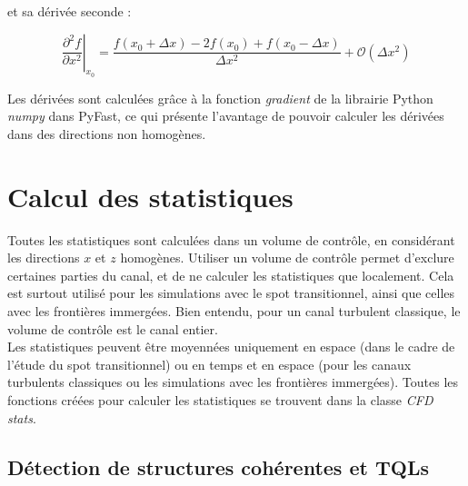 et sa dérivée seconde :

\begin{equation}
    \left. \frac{\partial^{2} f}{\partial x^{2}} \right|_{x_{0}} = \frac{f(x_{0}+\Delta x)-2 f(x_{0})+f(x_{0}-\Delta x)}{\Delta x^{2}} + \mathcal{O}(\Delta x^{2})
\end{equation}

Les dérivées sont calculées grâce à la fonction \textit{gradient} de la librairie Python \textit{numpy} dans PyFast, ce qui présente l'avantage de pouvoir calculer les dérivées dans des directions non homogènes.

\clearpage
\section{Calcul des statistiques}

Toutes les statistiques sont calculées dans un volume de contrôle, en considérant les directions $x$ et $z$ homogènes. Utiliser un volume de contrôle permet d'exclure certaines parties du canal, et de ne calculer les statistiques que localement. Cela est surtout utilisé pour les simulations avec le spot transitionnel, ainsi que celles avec les frontières immergées. Bien entendu, pour un canal turbulent classique, le volume de contrôle est le canal entier. \\

Les statistiques peuvent être moyennées uniquement en espace (dans le cadre de l'étude du spot transitionnel) ou en temps et en espace (pour les canaux turbulents classiques ou les simulations avec les frontières immergées). Toutes les fonctions créées pour calculer les statistiques se trouvent dans la classe \textit{CFD stats}. 


\subsection{Détection de structures cohérentes et TQLs}

